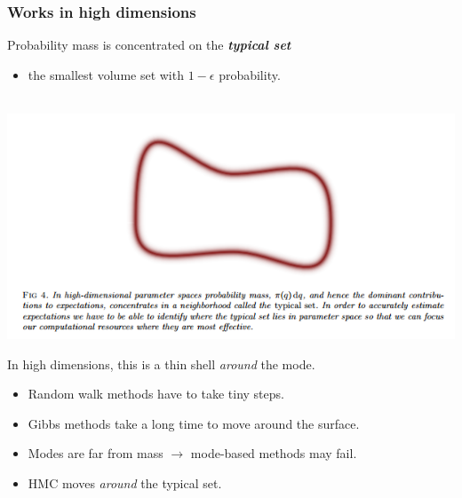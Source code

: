 \documentclass[xcolor=dvipsnames]{beamer}
\begin{document}
\begin{frame}
\frametitle{Works in high dimensions}
Probability mass is concentrated on the \emph{\textbf{\color{red} typical set}}
\begin{itemize}
\item the smallest volume set with $1 - \epsilon$ probability.\\~\\
\end{itemize}
\begin{center}
\includegraphics[height=0.4\textheight]{typicalset.png}
\end{center}
In high dimensions, this is a thin shell \emph{around} the mode.
\begin{itemize}
\item Random walk methods have to take tiny steps.
\item Gibbs methods take a long time to move around the surface.
\item Modes are far from mass $\to$ mode-based methods may fail.
\item HMC moves \emph{around} the typical set.
\end{itemize}
\end{frame}
\end{document}
